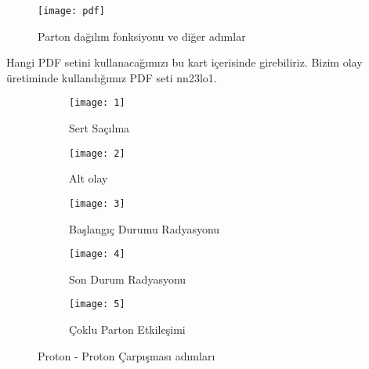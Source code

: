 \begin{figure}[!h]
\centering
\texttt{[image: pdf]}
\caption{Parton dağılım fonksiyonu ve diğer adımlar}
\label{fig:pdf}
\end{figure}

 Hangi PDF setini kullanacağımızı bu kart içerisinde girebiliriz. Bizim olay üretiminde kullandığımız PDF seti nn23lo1.

\begin{figure}[!htpb]
\centering
\begin{subfigure}[b]{0.5\textwidth}
\texttt{[image: 1]}
\caption{Sert Saçılma}
\end{subfigure}

\begin{subfigure}[b]{0.5\textwidth}
\texttt{[image: 2]}
\caption{Alt olay}
\end{subfigure}

\begin{subfigure}[b]{0.5\textwidth}
\texttt{[image: 3]}
\caption{Başlangıç Durumu Radyasyonu}
\end{subfigure}

\begin{subfigure}[b]{0.5\textwidth}
\texttt{[image: 4]}
\caption{Son Durum Radyasyonu}
\end{subfigure}

\begin{subfigure}[b]{0.5\textwidth}
\texttt{[image: 5]}
\caption{Çoklu Parton Etkileşimi}
\end{subfigure}
\caption{Proton - Proton Çarpışması adımları}
\end{figure}


